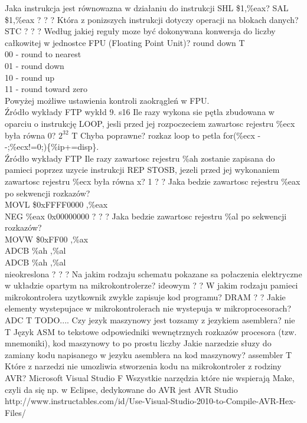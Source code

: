 {Jaka instrukcja jest równowazna w działaniu do instrukcji SHL \$1,\%eax?}
{SAL \$1,\%eax}
{?}
{?}
{?}
\answer
{Która z ponizszych instrukcji dotyczy operacji na blokach danych?}
{STC}
{?}
{?}
{?}
\answer
{Według jakiej reguły moze być dokonywana konwersja do liczby całkowitej w jednostce FPU (Floating Point Unit)?
}
{round down}
{T}
{\\
	00 - round to nearest\\
	01 - round down\\
	10 - round up\\
	11 - round toward zero\\}
{Powyżej możliwe ustawienia kontroli zaokrągleń w FPU. \\Źródło wykłady FTP wykłd 9. s16}
\answer
{Ile razy wykona sie pętla zbudowana w oparciu o instrukcję LOOP, jesli przed jej rozpoczeciem zawartosc rejestru \%ecx była równa 0? }
{$2^{32}$}
{T}
{Chyba poprawne?}
{rozkaz loop to petla for(\%ecx - -;\%ecx!=0;)\{\%ip+=disp\}. \\Źródło wykłady FTP}
\answer
{Ile razy zawartosc rejestru \%ah zostanie zapisana do pamieci poprzez uzycie instrukcji REP STOSB, jezeli przed jej wykonaniem zawartosc rejestru \%ecx była równa x?}
{1}
{?}
{?}
\answer
{
	Jaka bedzie zawartosc rejestru \%eax po sekwencji rozkazów?\\
	MOVL \$0xFFFF0000 ,\%eax\\
	NEG \%eax
}
{0x00000000}
{?}
{?}
{?}
\answer
{Jaka bedzie zawartosc rejestru \%al po sekwencji rozkazów? \\
	MOVW \$0xFF00 ,\%ax\\
	ADCB \%ah ,\%al\\
	ADCB \%ah ,\%al\\
	}
{nieokreslona}
{?}
{?}
{?}
\answer
{Na jakim rodzaju schematu pokazane sa połaczenia elektryczne w układzie opartym na mikrokontrolerze?}
{ideowym}
{?}
{?}
{}
\answer
{W jakim rodzaju pamieci mikrokontrolera uzytkownik zwykle zapisuje kod programu?}
{DRAM}
{?}
{?}
{}
\answer
{Jakie elementy wystepujace w mikrokontrolerach nie wystepuja w mikroprocesorach?}
{ADC}
{T}
{TODO....}
{}
\answer
{Czy jezyk maszynowy jest tozsamy z jezykiem asemblera? }
{nie}
{T}
{}
{Język ASM to tekstowe odpowiedniki wewnętrznych rozkazów procesora (tzw. mnemoniki), kod maszynowy to po prostu liczby}
\answer
{Jakie narzedzie słuzy do zamiany kodu napisanego w jezyku asemblera na kod maszynowy? }
{assembler}
{T}
{}
{}
\answer
{Które z narzedzi nie umozliwia stworzenia kodu na mikrokontroler z rodziny AVR?}
{Microsoft Visual Studio
}
{F}
{Wszystkie narzędzia które nie wspierają Make, czyli da się np. w Eclipse, dedykowane do AVR jest AVR Studio}
{http://www.instructables.com/id/Use-Visual-Studio-2010-to-Compile-AVR-Hex-Files/}
